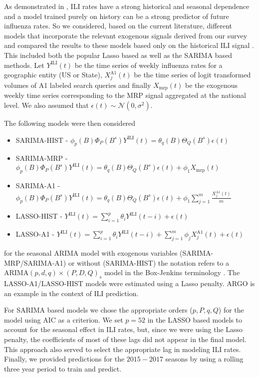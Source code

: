 \documentclass[fleqn,10pt]{wlscirep}
\begin{document}
As demonstrated in \cite{lazer_etal_2014}, ILI rates have a strong historical and seasonal dependence and a model trained purely on history can be a strong predictor of future influenza rates. So we considered, based on the current literature, different models that incorporate the relevant exogenous signals derived from our survey and compared the results to these models based only on the historical ILI signal \cite{yang_etal_2015}. This included both the popular Lasso based \cite{yang_etal_2015} as well as the SARIMA based methods. Let $Y^{\text{ILI}}(t)$ be the time series of weekly influenza rates for a geographic entity (US or State), $X_j^{\text{A1}}(t)$ be the time series of logit transformed volumes of A1 labeled search queries and finally $X_{\text{mrp}}(t)$ be the exogenous weekly time series corresponding to the MRP signal aggregated at the national level. We also assumed that $\epsilon(t) \sim \mathcal{N}(0,\sigma^2)$. 

The following models were then considered
\begin{itemize}
\item SARIMA-HIST - $\phi_p(B)\Phi_P(B^s)Y^{\text{ILI}}(t) = \theta_q(B)\Theta_Q(B^s)\epsilon(t)$ \item SARIMA-MRP - $\phi_p(B)\Phi_P(B^s)Y^{\text{ILI}}(t) =  \theta_q(B)\Theta_Q(B^s)\epsilon(t) + \phi_1 X_{\text{mrp}}(t)$ 
\item SARIMA-A1 - $\phi_p(B)\Phi_P(B^s)Y^{\text{ILI}}(t) =  \theta_q(B)\Theta_Q(B^s)\epsilon(t) + \phi_1 \sum_{j=1}^m \frac{X_j^{\text{A1}}(t)}{m}$ 
\item LASSO-HIST - $Y^{\text{ILI}}(t) = \sum_{i=1}^p \theta_i Y^{\text{ILI}}(t-i)+\epsilon(t)$
\item LASSO-A1 - $Y^{\text{ILI}}(t) = \sum_{i=1}^p \theta_i Y^{\text{ILI}}(t-i) +  \sum_{j=1}^m \phi_j X_j^{\text{A1}}(t) + \epsilon(t)$
\end{itemize}
for the seasonal ARIMA model with exogenous variables (SARIMA-MRP/SARIMA-A1) or without (SARIMA-HIST) the notation refers to a ARIMA$(p,d,q)\times(P,D,Q)_s$ model in the Box-Jenkins terminology \cite{box_etal_2015}. The LASSO-A1/LASSO-HIST models were estimated using a Lasso penalty. ARGO \cite{yang_etal_2015inference, yang_etal_2015} is an example in the context of ILI prediction.  

For SARIMA based models we chose the appropriate orders ($p,P,q,Q$) for the model using AIC as a criterion. We set $p=52$ in the LASSO based models to account for the seasonal effect in ILI rates, but, since we were using the Lasso penalty, the coefficients of most of these lags did not appear in the final model. This approach also served to select the appropriate lag in modeling ILI rates. Finally, we provided predictions for the $2015-2017$ seasons by using a rolling three year period to train and predict.
\end{document}
